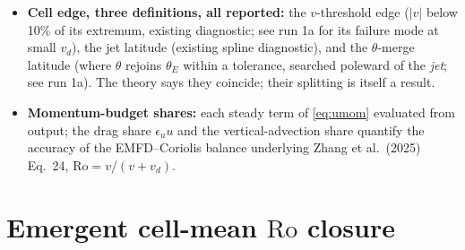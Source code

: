 \documentclass[11pt]{article}
\newcommand{\Ro}{\mathrm{Ro}}
\begin{document}
\begin{itemize}
{    fixed interval:} both are computed over $[y_5,\, y_{\mathrm{jet}}]$
    with $y_5 \equiv a \times 5^\circ = 5.56\times 10^5$~m, the beta-plane
    analog of Hill et al.\ (2025)'s convention (average from the
    descending edge to whichever of the ascending edge or $5^\circ$ is
    closer, $\Ro$ being ill-defined near the equator; for the symmetric
    cells here the $5^\circ$ cutoff binds). (i) The area mean of local
    $\Ro$; (ii) the best-fit $\Ro$ regressing $u(y)$ against $\beta
    y^2/2$, the \emph{primary} definition (insensitive to the interval).
    The earlier inner anchor $y_{\Ro\text{-max}}$ (argmax of the $\Ro$
    profile) was retired 2026-07-17: an argmax is a discontinuous
    functional of a smooth profile, and it jumped $1.1\times 10^6$~m
    between epochs of run 1a when the profile's two gentle extrema traded
    rank, moving the area mean 0.476 $\to$ 0.355. On the fixed interval
    the two equilibrated runs' area means nearly coincide (0.429, 0.424).
  \item \textbf{Cell edge, three definitions, all reported:} the
    $v$-threshold edge ($|v|$ below 10\% of its extremum, existing
    diagnostic; see run 1a for its failure mode at small $v_d$), the jet
    latitude (existing spline diagnostic), and the $\theta$-merge latitude
    (where $\theta$ rejoins $\theta_E$ within a tolerance, searched
    poleward of the \emph{jet}; see run 1a). The theory says they coincide;
    their splitting is itself a result.
  \item \textbf{Momentum-budget shares:} each steady term of
    \eqref{eq:umom} evaluated from output; the drag share $\epsilon_u u$
    and the vertical-advection share quantify the accuracy of the
    EMFD--Coriolis balance underlying Zhang et al.\ (2025) Eq.~24,
    $\Ro = v/(v + v_d)$.
\end{itemize}

\section{Emergent cell-mean $\Ro$ closure}
\label{sec:closure}
\end{document}
